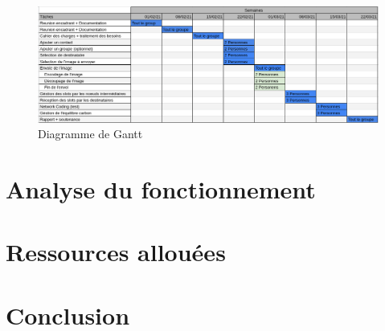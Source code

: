 \documentclass[a4paper, 12pt]{article}
\begin{document}
    \begin{figure}[H]
        \centering
        \includegraphics[scale=0.4]{images/gantt.png}
        \caption{Diagramme de Gantt}
        \label{fig:diagramme_gantt}
    \end{figure}

\section{Analyse du fonctionnement}

\section{Ressources allouées}

\section{Conclusion}
\end{document}
